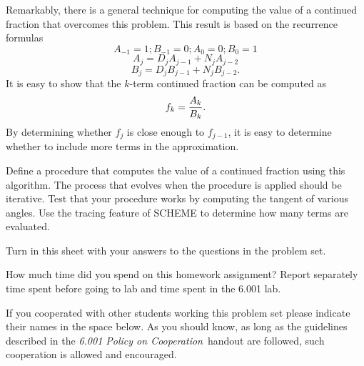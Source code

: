 Remarkably, there is a general technique for computing the value of a
continued fraction that overcomes this problem. This result is based
on the recurrence formulas
\begin{equation}
A_{-1}=1;B_{-1}=0;A_0=0;B_0=1
\end{equation}
\begin{equation}
A_j=D_jA_{j-1}+N_jA_{j-2}
\end{equation}
\begin{equation}
B_j=D_jB_{j-1}+N_jB_{j-2}.
\end{equation}
It is easy to show that the $k$-term continued fraction can be computed as
\begin{equation}
f_k={{A_k} \over {B_k}}.
\end{equation}
By determining whether $f_j$ is close enough to $f_{j-1}$, it is easy
to determine whether to include more terms in the approximation.

Define a procedure that computes the value of a continued fraction
using this algorithm. The process that evolves when the procedure is
applied should be iterative. Test that your procedure works by
computing the tangent of various angles. Use the tracing feature of
SCHEME to determine how many terms are evaluated.

\vspace{10ex}


Turn in this sheet with your answers to the questions in the problem set.

\vspace{6ex}

How much time did you spend on this homework assignment? Report separately
time spent before going to lab and time spent in the 6.001 lab.

\vspace{6ex}

If you cooperated with other students working this problem set
please indicate their names in the space below. As you should know,
as long as the guidelines described in the
{\em 6.001 Policy on Cooperation}\ handout are followed,
such cooperation is allowed and encouraged.




